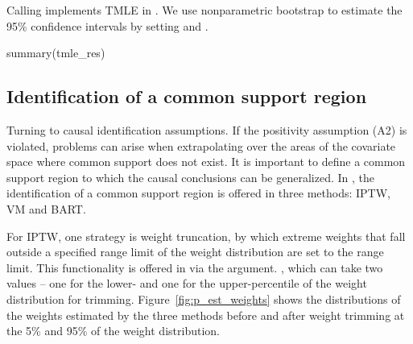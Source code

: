 Calling  implements TMLE in . We use nonparametric bootstrap to estimate the 95\% confidence intervals by setting   and .

\begin{Schunk}
\end{Schunk}

\begin{Schunk}
\begin{Sinput}
summary(tmle_res)
\end{Sinput}
\end{Schunk}




\subsection{Identification of a common support region} \label{sec:positivity}
Turning to causal identification assumptions. If the positivity assumption (A2) is violated, problems can arise when extrapolating over the areas of the covariate space where common support does not exist. It is important to define a common support region to which the causal conclusions can be generalized. In , the identification of a common support region is offered in three methods: IPTW, VM and BART. 

For IPTW, one strategy is weight truncation, by which extreme weights that fall outside a specified range limit of the weight distribution are set to the range limit. This functionality is offered in   via the  argument. , which can take two values -- one for the lower- and one for the upper-percentile of the weight distribution for trimming. Figure~\ref{fig:p_est_weights} shows the distributions of the weights estimated by the three methods before and after weight trimming at the 5\% and 95\% of the weight distribution. 

